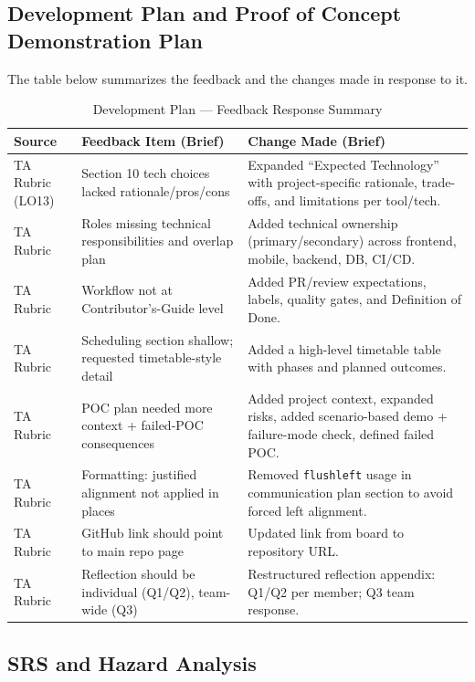 \documentclass{article}
\begin{document}
\subsection{Development Plan and Proof of Concept Demonstration Plan}
The table below summarizes the feedback and the changes made in response to it.
\begin{table}[H]
\caption{Development Plan --- Feedback Response Summary} \label{TblDevPlanFeedbackResponse}
\begin{tabularx}{\textwidth}{lXX}
\toprule
\textbf{Source} & \textbf{Feedback Item (Brief)} & \textbf{Change Made (Brief)} \\
\midrule
TA Rubric (LO13) & Section 10 tech choices lacked rationale/pros/cons & Expanded ``Expected Technology'' with project-specific rationale, trade-offs, and limitations per tool/tech. \\
TA Rubric & Roles missing technical responsibilities and overlap plan & Added technical ownership (primary/secondary) across frontend, mobile, backend, DB, CI/CD. \\
TA Rubric & Workflow not at Contributor's-Guide level & Added PR/review expectations, labels, quality gates, and Definition of Done. \\
TA Rubric & Scheduling section shallow; requested timetable-style detail & Added a high-level timetable table with phases and planned outcomes. \\
TA Rubric & POC plan needed more context + failed-POC consequences & Added project context, expanded risks, added scenario-based demo + failure-mode check, defined failed POC. \\
TA Rubric & Formatting: justified alignment not applied in places & Removed \texttt{flushleft} usage in communication plan section to avoid forced left alignment. \\
TA Rubric & GitHub link should point to main repo page & Updated link from board to repository URL. \\
TA Rubric & Reflection should be individual (Q1/Q2), team-wide (Q3) & Restructured reflection appendix: Q1/Q2 per member; Q3 team response. \\
\bottomrule
\end{tabularx}
\end{table}

\subsection{SRS and Hazard Analysis}
\end{document}

